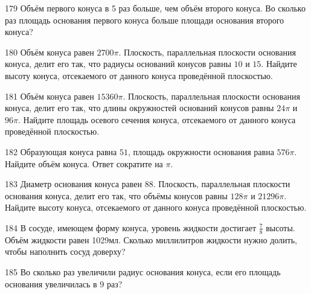 \documentclass[a4paper]{article}
\begin{document}
\begin{taskBN}{179}
Объём первого конуса в 5 раз больше, чем объём второго конуса. Во сколько раз площадь основания первого конуса больше площади основания второго конуса?
\end{taskBN}

\begin{taskBN}{180}
Объём конуса равен $2700\pi$. Плоскость, параллельная плоскости основания конуса,  делит его так, что радиусы оснований конусов равны $10$ и $15$. Найдите высоту конуса, отсекаемого от данного конуса проведённой плоскостью. 
\end{taskBN}

\begin{taskBN}{181}
Объём конуса равен $15360\pi$. Плоскость, параллельная плоскости основания конуса,  делит его так, что длины окружностей оснований конусов равны $24\pi$ и $96\pi$. Найдите площадь осевого сечения конуса, отсекаемого от данного конуса проведённой плоскостью. 
\end{taskBN}

\begin{taskBN}{182}
Образующая конуса равна $51$, площадь окружности основания равна $576\pi$. Найдите объём конуса. Ответ сократите на $\pi$.
\end{taskBN}

\begin{taskBN}{183}
Диаметр основания конуса равен $88$. Плоскость, параллельная плоскости основания конуса,  делит его так, что объёмы конусов равны $128\pi$ и $21296\pi$. Найдите высоту конуса, отсекаемого от данного конуса проведённой плоскостью. 
\end{taskBN}

\begin{taskBN}{184}
В сосуде, имеющем форму конуса, уровень жидкости достигает $\frac{7}{8}$ высоты. Объём жидкости равен 1029мл. Сколько миллилитров жидкости нужно долить, чтобы наполнить сосуд доверху?
\end{taskBN}

\begin{taskBN}{185}
Во сколько раз увеличили радиус основания конуса, если его площадь основания увеличилась в 9 раз?
\end{taskBN}
\end{document}
